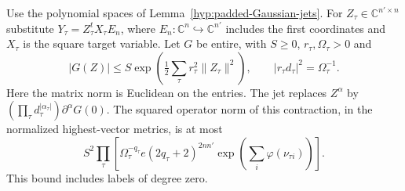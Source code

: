 \begin{lemma}\label{lem:padded-jet-estimate}
Use the polynomial spaces of Lemma~\ref{hyp:padded-Gaussian-jets}.
For \(Z_\tau\in\mathbb C^{n'\times n}\) substitute
\(Y_\tau=Z_\tau^t X_\tau E_n\), where \(E_n:\mathbb C^n\hookrightarrow\mathbb C^{n'}\)
includes the first coordinates and \(X_\tau\) is the square target
variable. Let \(G\) be entire, with \(S\ge0\), \(r_\tau,\Omega_\tau>0\) and
\[
 |G(Z)|\le S\exp\!\left(\tfrac12\sum_\tau r_\tau^2\|Z_\tau\|^2\right),
 \qquad |r_\tau d_\tau|^2=\Omega_\tau^{-1}.
\]
Here the matrix norm is Euclidean on the entries.
The jet replaces \(Z^\alpha\) by
\((\prod_\tau d_\tau^{|\alpha_\tau|})\partial^\alpha G(0)\).
The squared operator norm of this contraction,
in the normalized highest-vector metrics, is at most
\begin{equation}\label{eq:selected-padded-constant}
 S^2\prod_\tau\left[
    \Omega_\tau^{-q_\tau} e(2q_\tau+2)^{2nn'}
    \exp\!\left(\sum_i\varphi(\nu_{\tau i})\right)
 \right].
\end{equation}
This bound includes labels of degree zero.
\end{lemma}

